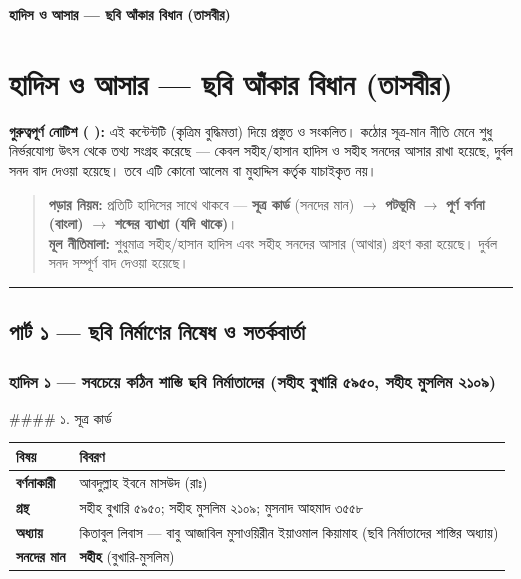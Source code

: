 

\begin{center}{\Large\bfseries\color{emerald} হাদিস ও আসার — ছবি আঁকার বিধান (তাসবীর)}\end{center}
\vspace{1em}
\section*{হাদিস ও আসার — ছবি আঁকার বিধান (তাসবীর)}

\begin{warnbox}
 \textbf{গুরুত্বপূর্ণ নোটিশ ( ):} এই কন্টেন্টটি  (কৃত্রিম বুদ্ধিমত্তা) দিয়ে প্রস্তুত ও সংকলিত।  কঠোর সূত্র-মান নীতি মেনে শুধু নির্ভরযোগ্য উৎস থেকে তথ্য সংগ্রহ করেছে — কেবল সহীহ/হাসান হাদিস ও সহীহ সনদের আসার রাখা হয়েছে, দুর্বল সনদ বাদ দেওয়া হয়েছে। তবে এটি কোনো আলেম বা মুহাদ্দিস কর্তৃক যাচাইকৃত নয়।
\end{warnbox}

\begin{quote}
\textbf{পড়ার নিয়ম:} প্রতিটি হাদিসের সাথে থাকবে — \textbf{সূত্র কার্ড} (সনদের মান) $\rightarrow$ \textbf{পটভূমি} $\rightarrow$ \textbf{পূর্ণ বর্ণনা (বাংলা)} $\rightarrow$ \textbf{শব্দের ব্যাখ্যা (যদি থাকে)}। \\
\textbf{মূল নীতিমালা:} শুধুমাত্র সহীহ/হাসান হাদিস এবং সহীহ সনদের আসার (আথার) গ্রহণ করা হয়েছে। দুর্বল সনদ সম্পূর্ণ বাদ দেওয়া হয়েছে।
\end{quote}

\medskip\hrule\medskip

\subsection*{পার্ট ১ — ছবি নির্মাণের নিষেধ ও সতর্কবার্তা}

\subsubsection*{হাদিস ১ — সবচেয়ে কঠিন শাস্তি ছবি নির্মাতাদের (সহীহ বুখারি ৫৯৫০, সহীহ মুসলিম ২১০৯)}

\#\#\#\# ১. সূত্র কার্ড

\begin{table}[h]\centering\small
\begin{tabular}{ll}
বিষয় & বিবরণ \\
\hline
\textbf{বর্ণনাকারী} & আবদুল্লাহ ইবনে মাসউদ (রাঃ) \\
\textbf{গ্রন্থ} & সহীহ বুখারি ৫৯৫০; সহীহ মুসলিম ২১০৯; মুসনাদ আহমাদ ৩৫৫৮ \\
\textbf{অধ্যায়} & কিতাবুল লিবাস — বাবু আজাবিল মুসাওয়িরীন ইয়াওমাল কিয়ামাহ (ছবি নির্মাতাদের শাস্তির অধ্যায়) \\
\textbf{সনদের মান} & \textbf{সহীহ} (বুখারি-মুসলিম) \\
\hline
\end{tabular}
\end{table}

